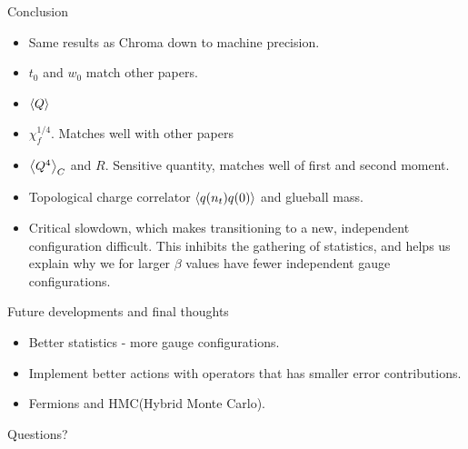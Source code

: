 \documentclass[10pt,show notes on second screen]{beamer}
\begin{document}
\begin{frame}{Conclusion}
{\begin{itemize}
    \item <2->Same results as Chroma down to machine precision.
    \item <3->$t_0$ and $w_0$ match other papers.
    \item <4->$\left\langle{Q}\right\rangle$
    \item <5->$\chi^{1/4}_f$. Matches well with other papers
    \item <6->$\left\langle{Q^4}\right\rangle_C$ and $R$. Sensitive quantity, matches well of first and second moment.
    \item <7->Topological charge correlator $\left\langle{q(n_t)q(0)}\right\rangle$ and glueball mass.
    \item <8->Critical slowdown, which makes transitioning to a new, independent configuration difficult. This inhibits the gathering of statistics, and helps us explain why we for larger $\beta$ values have fewer independent gauge configurations.
\end{itemize}
}
\end{frame}

\begin{frame}{Future developments and final thoughts}
\begin{itemize}[<+->]
    \item Better statistics - more gauge configurations.
    \item Implement better actions with operators that has smaller error contributions.
    \item Fermions and HMC(Hybrid Monte Carlo).
\end{itemize}
\end{frame}

\begin{frame}
\begin{center}
Questions?
\end{center}
\end{frame}

\end{document}
